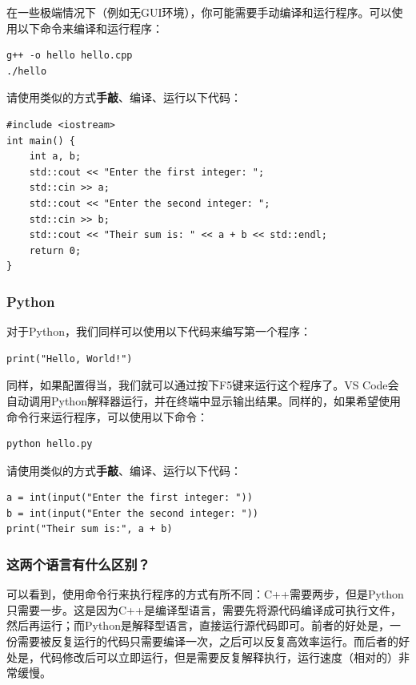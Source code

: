 在一些极端情况下（例如无GUI环境），你可能需要手动编译和运行程序。可以使用以下命令来编译和运行程序：

\begin{verbatim}
g++ -o hello hello.cpp
./hello
\end{verbatim}

请使用类似的方式\textbf{手敲}、编译、运行以下代码：

\begin{verbatim}
#include <iostream>
int main() {
    int a, b;
    std::cout << "Enter the first integer: ";
    std::cin >> a;
    std::cout << "Enter the second integer: ";
    std::cin >> b;
    std::cout << "Their sum is: " << a + b << std::endl;
    return 0;
}
\end{verbatim}

\subsubsection{Python}

对于Python，我们同样可以使用以下代码来编写第一个程序：

\begin{verbatim}
print("Hello, World!")
\end{verbatim}

同样，如果配置得当，我们就可以通过按下F5键来运行这个程序了。VS Code会自动调用Python解释器运行，并在终端中显示输出结果。同样的，如果希望使用命令行来运行程序，可以使用以下命令：

\begin{verbatim}
python hello.py
\end{verbatim}

请使用类似的方式\textbf{手敲}、编译、运行以下代码：

\begin{verbatim}
a = int(input("Enter the first integer: "))
b = int(input("Enter the second integer: "))
print("Their sum is:", a + b)
\end{verbatim}

\subsubsection{这两个语言有什么区别？}

可以看到，使用命令行来执行程序的方式有所不同：C++需要两步，但是Python只需要一步。这是因为C++是编译型语言，需要先将源代码编译成可执行文件，然后再运行；而Python是解释型语言，直接运行源代码即可。前者的好处是，一份需要被反复运行的代码只需要编译一次，之后可以反复高效率运行。而后者的好处是，代码修改后可以立即运行，但是需要反复解释执行，运行速度（相对的）非常缓慢。

